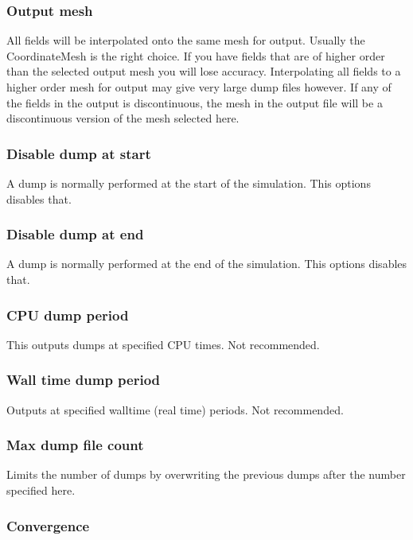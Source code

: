 \subsubsection{Output mesh}

All fields will be interpolated onto the same mesh for output. Usually the
CoordinateMesh is the right choice. If you have fields that are of
higher order than the selected output mesh you will lose 
accuracy. Interpolating all fields to a higher order mesh for output may give
very large dump files however. If any 
of the fields in the output is discontinuous, the mesh in the output file
will be a discontinuous version of the mesh selected here.

\subsubsection{Disable dump at start}

A dump is normally performed at the start of the simulation. This options disables that.

\subsubsection{Disable dump at end}

A dump is normally performed at the end of the simulation. This options disables that.

\subsubsection{CPU dump period}

This outputs dumps at specified CPU times. Not recommended.

\subsubsection{Wall time dump period}

Outputs at specified walltime (real time) periods. Not recommended.

\subsubsection{Max dump file count}

Limits the number of dumps by overwriting the previous dumps after the number specified here.

\subsubsection{Convergence}

